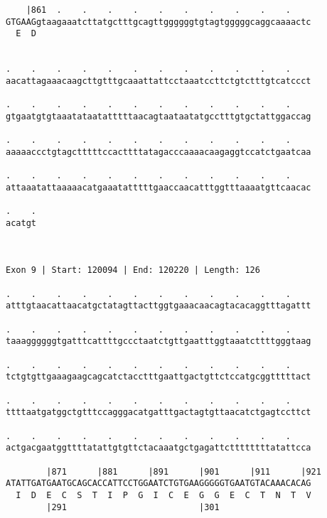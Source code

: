 \documentclass{article}
\begin{document}
\begin{Verbatim}
    |861  .    .    .    .    .    .    .    .    .    .    
GTGAAGgtaagaaatcttatgctttgcagttggggggtgtagtgggggcaggcaaaactc
  E  D                                                      
                                                            
  
.    .    .    .    .    .    .    .    .    .    .    .    
aacattagaaacaagcttgtttgcaaattattcctaaatccttctgtctttgtcatccct
                                                            
.    .    .    .    .    .    .    .    .    .    .    .    
gtgaatgtgtaaatataatatttttaacagtaataatatgcctttgtgctattggaccag
                                                            
.    .    .    .    .    .    .    .    .    .    .    .    
aaaaaccctgtagctttttccacttttatagacccaaaacaagaggtccatctgaatcaa
                                                            
.    .    .    .    .    .    .    .    .    .    .    .    
attaaatattaaaaacatgaaatatttttgaaccaacatttggtttaaaatgttcaacac
                                                            
.    .
acatgt
      
      
 
Exon 9 | Start: 120094 | End: 120220 | Length: 126
 
.    .    .    .    .    .    .    .    .    .    .    .    
atttgtaacattaacatgctatagttacttggtgaaacaacagtacacaggtttagattt
                                                            
.    .    .    .    .    .    .    .    .    .    .    .    
taaaggggggtgatttcattttgccctaatctgttgaatttggtaaatcttttgggtaag
                                                            
.    .    .    .    .    .    .    .    .    .    .    .    
tctgtgttgaaagaagcagcatctacctttgaattgactgttctccatgcggtttttact
                                                            
.    .    .    .    .    .    .    .    .    .    .    .    
ttttaatgatggctgtttccagggacatgatttgactagtgttaacatctgagtccttct
                                                            
.    .    .    .    .    .    .    .    .    .    .    .    
actgacgaatggttttatattgtgttctacaaatgctgagattcttttttttatattcca
                                                            
        |871      |881      |891      |901      |911      |921
ATATTGATGAATGCAGCACCATTCCTGGAATCTGTGAAGGGGGTGAATGTACAAACACAG
  I  D  E  C  S  T  I  P  G  I  C  E  G  G  E  C  T  N  T  V
        |291                          |301                  
  

\end{Verbatim}
\end{document}
